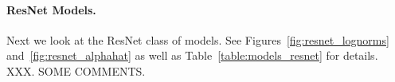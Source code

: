 \paragraph{ResNet Models.}

Next we look at the ResNet class of models. 
See
Figures~\ref{fig:resnet_lognorms}
and~\ref{fig:resnet_alphahat}
as well as
Table~\ref{table:models_resnet}
for details.
XXX.  SOME COMMENTS.

\begin{figure}[!htb]
   \centering
\end{figure}
